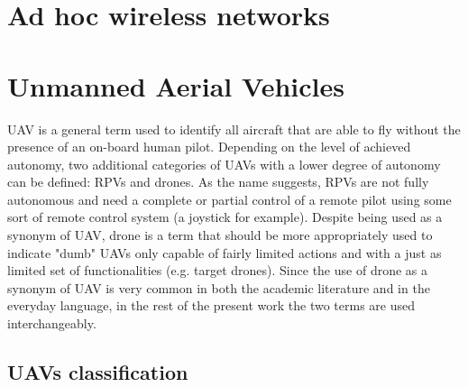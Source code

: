 %
%
%
%
%

\section{Ad hoc wireless networks}

\section{Unmanned Aerial Vehicles}

\gls{UAV} is a general term used to identify all aircraft that are able to fly without the presence of an on-board human pilot. Depending on the level of achieved autonomy, two additional categories of \glspl{UAV} with a lower degree of autonomy can be defined: \glspl{RPV} and drones. As the name suggests, \glspl{RPV} are not fully autonomous and need a complete or partial control of a remote pilot using some sort of remote control system (a joystick for example). Despite being used as a synonym of \gls{UAV}, drone is a term that should be more appropriately used to indicate "dumb" \glspl{UAV} only capable of fairly limited actions and with a just as limited set of functionalities (e.g. target drones). Since the use of drone as a synonym of \gls{UAV} is very common in both the academic literature and in the everyday language, in the rest of the present work the two terms are used interchangeably. 

\subsection{\glspl{UAV} classification}

